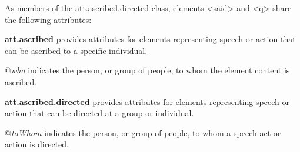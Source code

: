 As members of the \textsf{att.ascribed.directed} class, elements \hyperref[TEI.said]{<said>} and \hyperref[TEI.q]{<q>} share the following attributes: 
\begin{sansreflist}
  
\item [\textbf{att.ascribed}] provides attributes for elements representing speech or action that can be ascribed to a specific individual.\hfil\\[-10pt]\begin{sansreflist}
    \item[@{\itshape who}]
  indicates the person, or group of people, to whom the element content is ascribed.
\end{sansreflist}  
\item [\textbf{att.ascribed.directed}] provides attributes for elements representing speech or action that can be directed at a group or individual.\hfil\\[-10pt]\begin{sansreflist}
    \item[@{\itshape toWhom}]
  indicates the person, or group of people, to whom a speech act or action is directed.
\end{sansreflist}  
\end{sansreflist}
